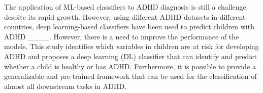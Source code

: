 The application of ML-based classifiers to ADHD diagnosis is still a challenge despite its rapid growth. However, using different ADHD datasets in different countries, deep learning-based classifiers have been used to predict children with ADHD ____. However, there is a need to improve the performance of the models. This study identifies which variables in children are at risk for developing ADHD and proposes a deep learning (DL) classifier that can identify and predict whether a child is healthy or has ADHD. Furthermore, it is possible to provide a generalizable and pre-trained framework that can be used for the classification of almost all downstream tasks in ADHD.